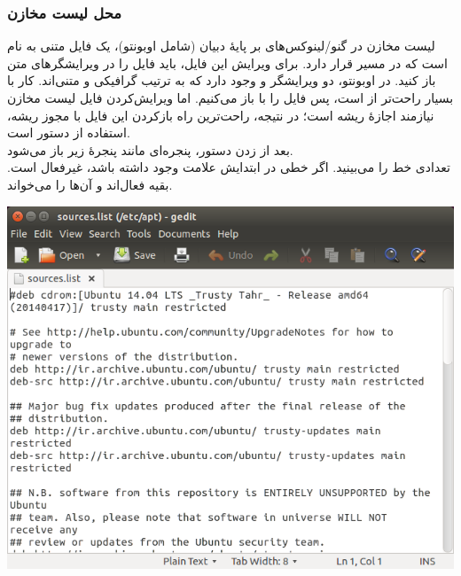 \subsubsection{محل لیست مخازن}
لیست مخازن در گنو/لینوکس‌های بر پایهٔ دبیان (شامل اوبونتو)، یک فایل متنی به نام  است که در مسیر  قرار دارد. برای ویرایش این فایل، باید فایل را در ویرایشگرهای متن باز کنید. در اوبونتو، دو ویرایشگر  و  وجود دارد که به ترتیب گرافیکی و متنی‌اند. کار با  بسیار راحت‌تر از  است، پس فایل را با  باز می‌کنیم. اما ویرایش‌کردن فایل لیست مخازن نیازمند اجازهٔ ریشه است؛ در نتیجه، راحت‌ترین راه بازکردن این فایل با مجوز ریشه، استفاده از دستور  است.\\
بعد از زدن دستور، پنجره‌ای مانند پنجرهٔ زیر باز می‌شود.\\
تعدادی خط را می‌بینید. اگر خطی در ابتدایش علامت \lr{\texttt{\#}} وجود داشته باشد، غیرفعال است. بقیه فعال‌اند و  آن‌ها را می‌خواند.

\begin{center}
\includegraphics[scale=0.5]{pics/36.png}
\end{center}


